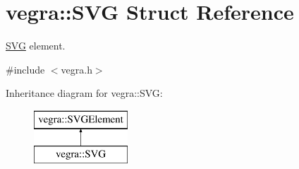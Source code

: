 \hypertarget{structvegra_1_1SVG}{}\section{vegra\+:\+:S\+VG Struct Reference}
\label{structvegra_1_1SVG}


\mbox{\hyperlink{structvegra_1_1SVG}{S\+VG}} element.  




{\ttfamily \#include $<$vegra.\+h$>$}

Inheritance diagram for vegra\+:\+:S\+VG\+:\begin{figure}[H]
\begin{center}
\leavevmode
\includegraphics[height=2.000000cm]{structvegra_1_1SVG}
\end{center}
\end{figure}
